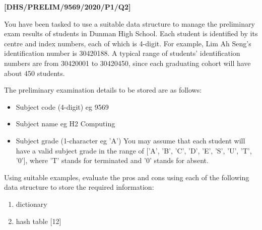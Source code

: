 \item \textbf{{[}DHS/PRELIM/9569/2020/P1/Q2{]} }

You have been tasked to use a suitable data structure to manage the
preliminary exam results of students in Dunman High School. Each student
is identified by its centre and index numbers, each of which is 4-digit.
For example, Lim Ah Seng's identification number is 30420188. A typical
range of students' identification numbers are from 30420001 to 30420450,
since each graduating cohort will have about 450 students. 

The preliminary examination details to be stored are as follows: 
\begin{itemize}
\item Subject code (4-digit) eg 9569 
\item Subject name eg H2 Computing 
\item Subject grade (1-character eg 'A') You may assume that each student
will have a valid subject grade in the range of {[}'A', 'B', 'C',
'D', 'E', 'S', 'U', 'T', '0'{]}, where 'T' stands for terminated and
'0' stands for absent. 
\end{itemize}
Using suitable examples, evaluate the pros and cons using each of
the following data structure to store the required information: 
\begin{enumerate}
\item dictionary 
\item hash table \hfill{}{[}12{]}
\end{enumerate}